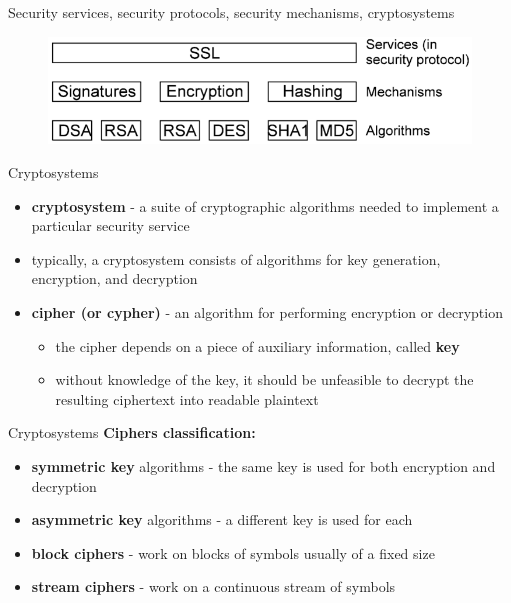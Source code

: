 \documentclass[pdf]{beamer}
\begin{document}
\begin{frame}{Security services, security protocols, security mechanisms, cryptosystems}

\begin{figure}[t]
\centering
\includegraphics[scale=0.5]{Images/SSSM}
\end{figure}

\end{frame}



\begin{frame}{Cryptosystems}
\begin{itemize}
\item
\textbf{cryptosystem} - a suite of cryptographic algorithms needed to implement a particular security service

\item
typically, a cryptosystem consists of algorithms for key generation, encryption, and decryption

\item
\textbf{cipher (or cypher)} - an algorithm for performing encryption or decryption

\begin{itemize}
\item
the cipher depends on a piece of auxiliary information, called \textbf{key}

\item
without knowledge of the key, it should be unfeasible to decrypt the resulting ciphertext into readable plaintext
\end{itemize}

\end{itemize}
\end{frame}



\begin{frame}{Cryptosystems}
\textbf{Ciphers classification:}
\begin{itemize}
\item
\textbf{symmetric key} algorithms - the same key is used for both encryption and decryption 
\item
\textbf{asymmetric key} algorithms - a different key is used for each 
\end{itemize}

\begin{itemize}
\item
\textbf{block ciphers} - work on blocks of symbols usually of a fixed size 

\item
\textbf{stream ciphers} - work on a continuous stream of symbols

\end{itemize}
\end{frame}
\end{document}

